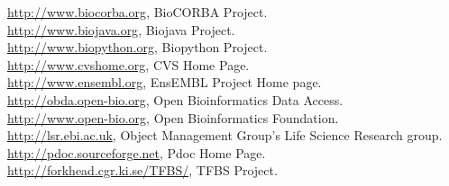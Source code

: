 \documentclass[12pt]{article}
\begin{document}
\url{http://www.biocorba.org}, BioCORBA Project. \\
\url{http://www.biojava.org}, Biojava Project. \\
\url{http://www.biopython.org}, Biopython Project. \\
\url{http://www.cvshome.org}, CVS Home Page. \\
\url{http://www.ensembl.org}, EnsEMBL Project Home page. \\
\url{http://obda.open-bio.org}, Open Bioinformatics Data Access. \\
\url{http://www.open-bio.org}, Open Bioinformatics Foundation. \\
\url{http://lsr.ebi.ac.uk}, Object Management Group's Life Science Research group. \\
\url{http://pdoc.sourceforge.net}, Pdoc Home Page. \\
\url{http://forkhead.cgr.ki.se/TFBS/}, TFBS Project. \\

\newpage 


\pagestyle{fancy}
\fancyhf{}
\renewcommand{\headrulewidth}{0pt}

\end{document}
